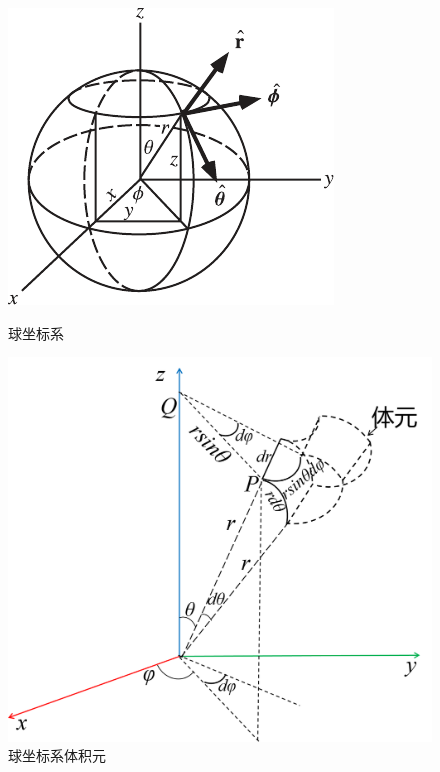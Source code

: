 \begin{figure}[ht]
    \centering
    \begin{minipage}{0.42\textwidth}
        \centering
        \setlength{\abovecaptionskip}{0.2cm}
        \includegraphics{./figure/math/SphericalCoordinates.pdf}
        \caption{球坐标系}
        \label{fig:SphererCoord} 
    \end{minipage}
    \begin{minipage}{0.42\textwidth}
        \centering
        \setlength{\abovecaptionskip}{0.2cm}
        \includegraphics[scale = 0.125]{./figure/math/sphere-vol-ele.png}
        \caption{球坐标系体积元}
        \label{fig:Spherer-Volele} 
    \end{minipage}
\end{figure}

